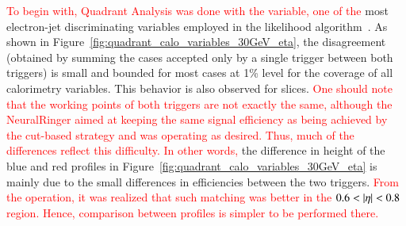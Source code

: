 
\textcolor{red}{To begin with, Quadrant Analysis was done with the \reta{} variable, one of the} 
most electron-jet discriminating variables employed in the likelihood
algorithm~\cite{aaboud2019electron}. As shown in Figure~\ref{fig:quadrant_calo_variables_30GeV_eta}, the disagreement (obtained by summing the cases accepted only by a single trigger between both triggers) is small and bounded for most cases at 1\% level for the coverage of all calorimetry variables. 
This behavior is also observed for \et{} slices. 
\textcolor{red}{One should note that the working points of both triggers are not  exactly the same, although the NeuralRinger aimed at keeping the same signal efficiency as being achieved by the cut-based strategy and was operating as desired.  Thus, much of the differences reflect this difficulty. In other words, }
the difference in height of the blue and red profiles in Figure~\ref{fig:quadrant_calo_variables_30GeV_eta} is mainly due to the small differences in efficiencies between the two triggers.
\textcolor{red}{From the operation, it was realized that such matching was better in the $0.6<\abseta{}<0.8$ region. Hence, comparison between profiles is simpler to be performed there.}


